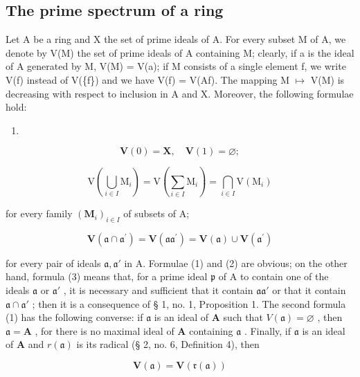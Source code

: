 \subsection{The prime spectrum of a ring}

Let A be a ring and X the set of prime ideals of A. For every subset M of A, we denote by V(M) the set of prime ideals of A containing M; clearly, if a is the ideal of A generated by M, V(M) = V(a); if M consists of a single element f, we write V(f) instead of V(\{f\}) and we have V(f) = V(Af). The mapping M \(\mapsto\) V(M) is decreasing with respect to inclusion in A and X. Moreover, the following formulae hold:

\begin{enumerate}
\def\labelenumi{(\arabic{enumi})}
\tightlist
\item
\end{enumerate}

\[
\mathbf {V} (0) = \mathbf {X}, \quad \mathbf {V} (1) = \varnothing ;\tag{1}
\]

\[
\mathrm{V} \left(\bigcup_ {i \in I} \mathrm{M} _ {i}\right) = \mathrm{V} \left(\sum_ {i \in I} \mathrm{M} _ {i}\right) = \bigcap_ {i \in I} \mathrm{V} (\mathrm{M} _ {i})\tag{2}
\]

for every family \((\mathbf{M}_i)_{i\in I}\) of subsets of A;

\[
\mathbf {V} (\mathfrak {a} \cap \mathfrak {a} ^ {\prime}) = \mathbf {V} (\mathfrak {a a} ^ {\prime}) = \mathbf {V} (\mathfrak {a}) \cup \mathbf {V} (\mathfrak {a} ^ {\prime})\tag{3}
\]

for every pair of ideals \(\mathfrak{a},\mathfrak{a}'\) in A. Formulae (1) and (2) are obvious; on the other hand, formula (3) means that, for a prime ideal \(\mathfrak{p}\) of A to contain one of the ideals \(\mathfrak{a}\) or \(\mathfrak{a}'\) , it is necessary and sufficient that it contain \(\mathfrak{a}\mathfrak{a}'\) or that it contain \(\mathfrak{a} \cap \mathfrak{a}'\) ; then it is a consequence of § 1, no. 1, Proposition 1. The second formula (1) has the following converse: if \(\mathfrak{a}\) is an ideal of \(\mathbf{A}\) such that \(V(\mathfrak{a}) = \varnothing\) , then \(\mathfrak{a} = \mathbf{A}\) , for there is no maximal ideal of \(\mathbf{A}\) containing \(\mathfrak{a}\) . Finally, if \(\mathfrak{a}\) is an ideal of \(\mathbf{A}\) and \(r(\mathfrak{a})\) is its radical (§ 2, no. 6, Definition 4), then

\[
\mathbf {V} (\mathfrak {a}) = \mathbf {V} (\mathfrak {r} (\mathfrak {a}))\tag{4}
\]

